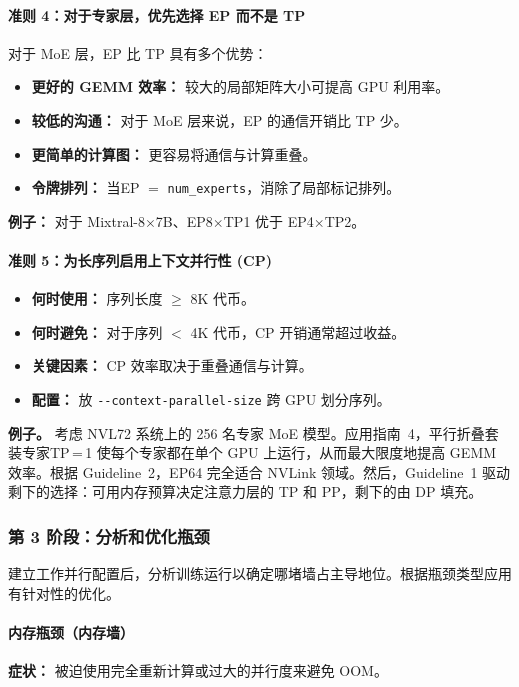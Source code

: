 \paragraph*{准则 4：对于专家层，优先选择 EP 而不是 TP}
对于 MoE 层，EP 比 TP 具有多个优势：
\begin{itemize}
    \item \textbf{更好的 GEMM 效率：} 较大的局部矩阵大小可提高 GPU 利用率。
    \item \textbf{较低的沟通：} 对于 MoE 层来说，EP 的通信开销比 TP 少。
    \item \textbf{更简单的计算图：} 更容易将通信与计算重叠。
    \item \textbf{令牌排列：} 当EP $=$ \texttt{num\_experts}，消除了局部标记排列。
\end{itemize}

\noindent\textbf{例子：} 对于 Mixtral-8$\times$7B、EP8$\times$TP1 优于 EP4$\times$TP2。

\paragraph*{准则 5：为长序列启用上下文并行性 (CP)}
\begin{itemize}
    \item \textbf{何时使用：} 序列长度 $\geq$ 8K 代币。
    \item \textbf{何时避免：} 对于序列 $<$ 4K 代币，CP 开销通常超过收益。
    \item \textbf{关键因素：} CP 效率取决于重叠通信与计算。
    \item \textbf{配置：} 放 \texttt{-{}-context-parallel-size} 跨 GPU 划分序列。
\end{itemize}

\noindent\textbf{例子。} 考虑 NVL72 系统上的 256 名专家 MoE 模型。应用指南~4，平行折叠套装专家TP\,=\,1 使每个专家都在单个 GPU 上运行，从而最大限度地提高 GEMM 效率。根据 Guideline~2，EP6​​4 完全适合 NVLink 领域。然后，Guideline~1 驱动剩下的选择：可用内存预算决定注意力层的 TP 和 PP，剩下的由 DP 填充。

\subsubsection{第 3 阶段：分析和优化瓶颈}

建立工作并行配置后，分析训练运行以确定哪堵墙占主导地位。根据瓶颈类型应用有针对性的优化。

\paragraph*{内存瓶颈（内存墙）}
\textbf{症状：} 被迫使用完全重新计算或过大的并行度来避免 OOM。

